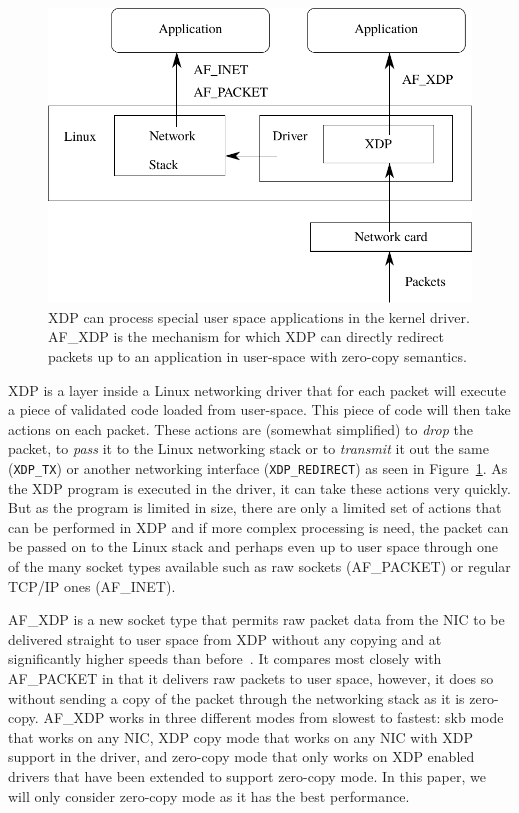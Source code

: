 \documentclass[9pt,numbers,reprint]{sigplanconf}
\begin{document}
\begin{figure}[ht]
\includegraphics[width=.5\textwidth]{xdp.pdf}
\caption{XDP can process special user space applications in the kernel
  driver. AF\_XDP is the mechanism for which XDP can directly redirect
  packets up to an application in user-space with zero-copy semantics.}
\label{fig:xdp}
\end{figure}

XDP is a layer inside a Linux networking driver that for each packet
will execute a piece of validated code loaded from
user-space. This piece of code will then take actions on each
packet. These actions are (somewhat simplified) to \emph{drop} the
packet, to \emph{pass} it to the Linux networking stack or to
\emph{transmit} it out the same ({\tt XDP\_TX}) or another networking
interface ({\tt XDP\_REDIRECT}) as seen in Figure~\ref{fig:xdp}. As the XDP
program is executed in the driver, it can take these actions
very quickly. But as the program is limited in size, there are only
a limited set of actions that can be performed in XDP and if more complex
processing is need, the packet can be passed on to the Linux stack and
perhaps even up to user space through one of the many socket types
available such as raw sockets (AF\_PACKET) or regular TCP/IP ones
(AF\_INET).

AF\_XDP is a new socket type that permits raw packet data from the NIC
to be delivered straight to user space from XDP without any copying
and at significantly higher speeds than before~\cite{af_packet_v4}. It
compares most closely with AF\_PACKET in that it delivers raw packets
to user space, however, it does so without sending a copy of the
packet through the networking stack as it is zero-copy. AF\_XDP works
in three different modes from slowest to fastest: skb mode that works
on any NIC, XDP copy mode that works on any NIC with XDP support in
the driver, and zero-copy mode that only works on XDP enabled drivers
that have been extended to support zero-copy mode. In this paper, we
will only consider zero-copy mode as it has the best performance.
\end{document}

